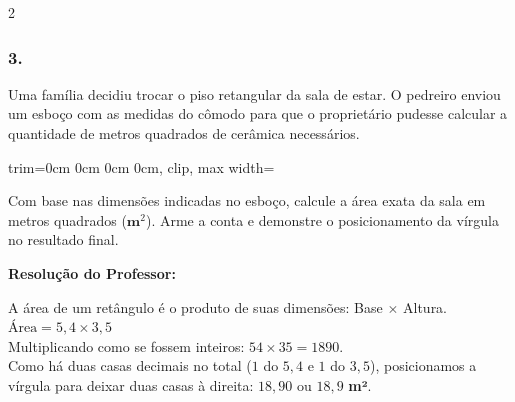 \begin{multicols*}{2}
\subsubsection*{3.} Uma família decidiu trocar o piso retangular da sala de estar. O pedreiro enviou um esboço com as medidas do cômodo para que o proprietário pudesse calcular a quantidade de metros quadrados de cerâmica necessários.
\begin{center}
\begin{adjustbox}{trim=0cm 0cm 0cm 0cm, clip, max width=\larguraTikz}
\end{adjustbox}
\end{center}
Com base nas dimensões indicadas no esboço, calcule a área exata da sala em metros quadrados ($ \textbf{m}^{2} $). Arme a conta e demonstre o posicionamento da vírgula no resultado final.

\ifgabarito
    \begin{tcolorbox}[colback=CorTitUm!5, colframe=CorTitUm, boxrule=1pt, arc=4pt, left=6pt, right=6pt, top=6pt, bottom=6pt]
    \small\textbf{\textcolor{CorTitUm}{Resolução do Professor:}}\par\vspace{0.1cm}
    \color{CinzaEscuro}
    A área de um retângulo é o produto de suas dimensões: Base $\times$ Altura.\\
    $ \text{Área} = 5,4 \times 3,5 $\\
    Multiplicando como se fossem inteiros: $ 54 \times 35 = 1890 $.\\
    Como há duas casas decimais no total ($1$ do $5,4$ e $1$ do $3,5$), posicionamos a vírgula para deixar duas casas à direita: $ 18,90 $ ou $ 18,9 $ \textbf{m²}.
    \end{tcolorbox}
\fi


\end{multicols*}
